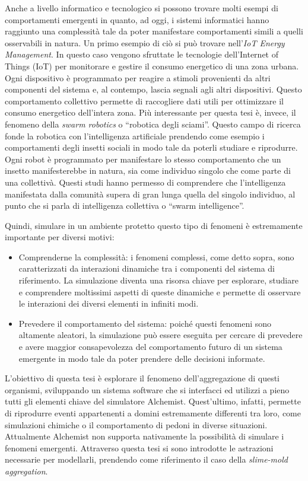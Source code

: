 Anche a livello informatico e tecnologico si possono trovare molti esempi di comportamenti emergenti in quanto, ad oggi, i sistemi informatici hanno 
raggiunto una complessità tale da poter manifestare comportamenti simili a quelli osservabili in natura.
Un primo esempio di ciò si può trovare nell'\textit{IoT Energy Management}. In questo caso vengono sfruttate le tecnologie dell'Internet of Things (IoT)
per monitorare e gestire il consumo energetico di una zona urbana. Ogni dispositivo è programmato per reagire a stimoli provenienti da altri componenti del sistema e, al contempo,
lascia segnali agli altri dispositivi. Questo comportamento collettivo permette di raccogliere dati utili per ottimizzare il consumo energetico dell'intera zona.
Più interessante per questa tesi è, invece, il fenomeno della \textit{swarm robotics} o ``robotica degli sciami''. Questo campo di ricerca fonde la robotica con l'intelligenza artificiale 
prendendo come esempio i comportamenti degli insetti sociali in modo tale da poterli studiare e riprodurre. Ogni robot è programmato per manifestare lo stesso comportamento 
che un insetto manifesterebbe in natura, sia come individuo singolo che come parte di una collettivà. Questi studi hanno permesso di comprendere che
l'intelligenza manifestata dalla comunità supera di gran lunga quella del singolo individuo, al punto che si parla di intelligenza collettiva o ``swarm intelligence''.

Quindi, simulare in un ambiente protetto questo tipo di fenomeni è estremamente importante per diversi motivi:
\begin{itemize}
    \item Comprenderne la complessità: i fenomeni complessi, come detto sopra, sono caratterizzati da interazioni dinamiche tra
    i componenti del sistema di riferimento. La simulazione diventa una risorsa chiave per esplorare, studiare e comprendere 
    moltissimi aspetti di queste dinamiche e permette di osservare le interazioni dei diversi elementi in infiniti modi.
    \item Prevedere il comportamento del sistema: poiché questi fenomeni sono altamente aleatori, la simulazione può essere 
    eseguita per cercare di prevedere e avere maggior consapevolezza del comportamento
    futuro di un sistema emergente in modo tale da poter prendere delle decisioni informate.   
\end{itemize}

L'obiettivo di questa tesi è esplorare il fenomeno dell'aggregazione di questi organismi, sviluppando un sistema software che 
si interfacci ed utilizzi a pieno tutti gli elementi chiave del simulatore Alchemist. Quest'ultimo, infatti, permette di riprodurre eventi appartenenti 
a domini estremamente differenti tra loro, come simulazioni chimiche o il comportamento di pedoni in diverse situazioni. Attualmente Alchemist 
non supporta nativamente la possibilità di simulare i fenomeni emergenti. Attraverso questa tesi si sono introdotte
le astrazioni necessarie per modellarli, prendendo come riferimento il caso della \textit{slime-mold aggregation}.

